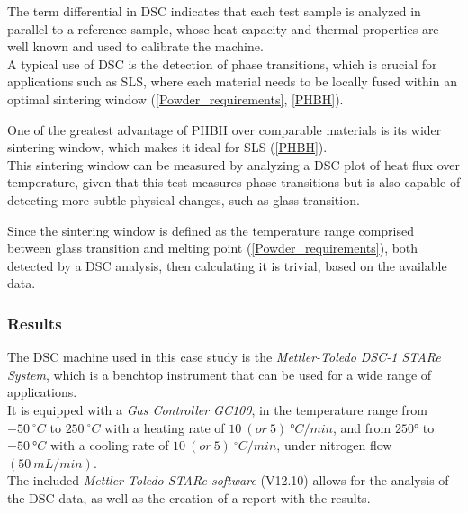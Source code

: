 \documentclass{article}
\begin{document}
        
        The term differential in DSC indicates that each test sample is analyzed in parallel to a reference sample, whose heat capacity and 
        thermal properties are well known and used to calibrate the machine. \\
        
        A typical use of DSC is the detection of phase transitions, which is crucial for applications such as SLS, where each material 
        needs to be locally fused within an optimal sintering window (\ref{Powder_requirements}, \ref{PHBH}). 

        One of the greatest advantage of PHBH over comparable materials is its wider sintering window, which makes it ideal 
        for SLS (\ref{PHBH}). \\ 

        This sintering window can be measured by analyzing a DSC plot of heat flux over temperature, given that this test measures 
        phase transitions but is also capable of detecting more subtle physical changes, such as glass transition. 

        Since the sintering window is defined as the temperature range comprised between glass transition and 
        melting point (\ref{Powder_requirements}), both detected by a DSC analysis, then calculating it is trivial, 
        based on the available data. 

            \subsubsection{Results}

                The DSC machine used in this case study is the \textit{Mettler-Toledo DSC-1 STARe System}, which is a benchtop instrument that can be used for 
                a wide range of applications. \\ 

                It is equipped with a \textit{Gas Controller GC100}, in the temperature range from $-50 \ ^{\circ} C$ 
                to $250 \ ^{\circ} C$ with 
                a heating rate of $10 \ (or \ 5) \ °C/min$, and from $250°$ to $-50 \ °C$ with a cooling rate of $10 \ (or \ 5) \ ^{\circ}C/min$, 
                under nitrogen flow $(50 \ mL/min)$. \\ 

                The included \textit{Mettler-Toledo STARe software} (V12.10) allows for the analysis of the 
                DSC data, as well as the creation of a report with the results. \\ 
\end{document}
